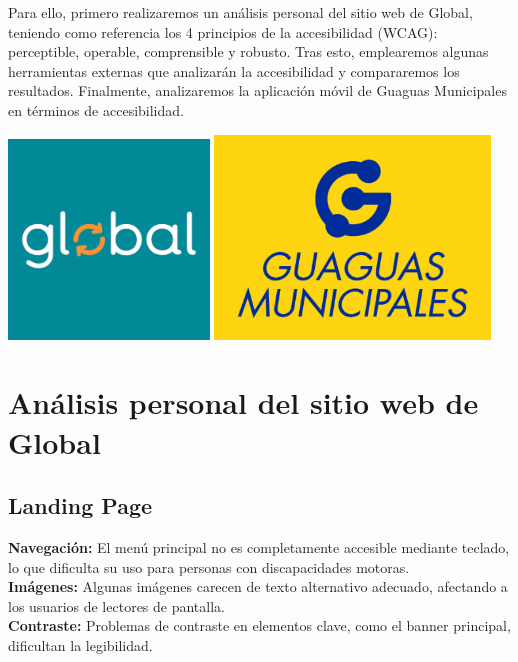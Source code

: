\documentclass[a4paper,12pt]{article}
\begin{document}
Para ello, primero realizaremos un análisis personal del sitio web de Global, teniendo como referencia los 4 principios de la accesibilidad (WCAG): perceptible, operable, comprensible y robusto. Tras esto, emplearemos algunas herramientas externas que analizarán la accesibilidad y compararemos los resultados. Finalmente, analizaremos la aplicación móvil de Guaguas Municipales en términos de accesibilidad.

\vspace{2cm}

\hspace{-0.5cm}
\includegraphics[width=0.4\textwidth]{Images/global.png}
\hspace{0.5cm}
\includegraphics[width=0.55\textwidth]{Images/guaguas_municipales.png}

\newpage

\section{Análisis personal del sitio web de Global}

\subsection{Landing Page}

\textbf{Navegación:} El menú principal no es completamente accesible mediante teclado, lo que dificulta su uso para personas con discapacidades motoras.\\
\textbf{Imágenes:} Algunas imágenes carecen de texto alternativo adecuado, afectando a los usuarios de lectores de pantalla.\\
\textbf{Contraste:} Problemas de contraste en elementos clave, como el banner principal, dificultan la legibilidad.
\end{document}
